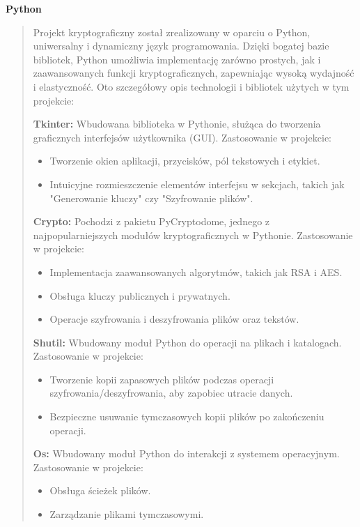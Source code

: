 \documentclass[12pt,a4paper]{article}
\begin{document}
\noindent\textbf{Python}
\begin{quotation}\noindent Projekt kryptograficzny został zrealizowany w oparciu o Python, uniwersalny i dynamiczny język programowania. Dzięki bogatej bazie bibliotek, Python umożliwia implementację zarówno prostych, jak i zaawansowanych funkcji kryptograficznych, zapewniając wysoką wydajność i elastyczność. Oto szczegółowy opis technologii i bibliotek użytych w tym projekcie:\newline

\noindent\textbf{Tkinter:}
Wbudowana biblioteka w Pythonie, służąca do tworzenia graficznych interfejsów użytkownika (GUI).\newline
Zastosowanie w projekcie:
\begin{itemize}
\item Tworzenie okien aplikacji, przycisków, pól tekstowych i etykiet.
\item Intuicyjne rozmieszczenie elementów interfejsu w sekcjach, takich jak "Generowanie kluczy" czy "Szyfrowanie plików".
\end{itemize}

\noindent\textbf{Crypto:}
Pochodzi z pakietu PyCryptodome, jednego z najpopularniejszych modułów kryptograficznych w Pythonie.\newline
Zastosowanie w projekcie:
\begin{itemize}
\item Implementacja zaawansowanych algorytmów, takich jak RSA i AES.
\item Obsługa kluczy publicznych i prywatnych.
\item Operacje szyfrowania i deszyfrowania plików oraz tekstów.
\end{itemize}

\noindent\textbf{Shutil:}
Wbudowany moduł Python do operacji na plikach i katalogach.\newline
Zastosowanie w projekcie:
\begin{itemize}
\item Tworzenie kopii zapasowych plików podczas operacji szyfrowania/deszyfrowania, aby zapobiec utracie danych.
\item Bezpieczne usuwanie tymczasowych kopii plików po zakończeniu operacji.
\end{itemize}

\noindent\textbf{Os:}
Wbudowany moduł Python do interakcji z systemem operacyjnym.\newline
Zastosowanie w projekcie:
\begin{itemize}
\item Obsługa ścieżek plików.
\item Zarządzanie plikami tymczasowymi.
\end{itemize}


\end{quotation}
\end{document}

